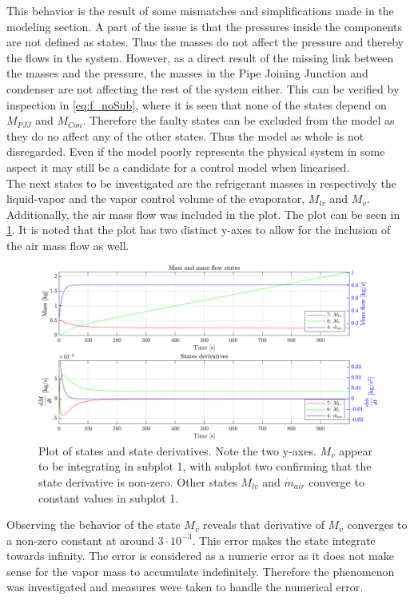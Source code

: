 This behavior is the result of some mismatches and simplifications made in the modeling section. A part of the issue is that the pressures inside the components are not defined as states. Thus the masses do not affect the pressure and thereby the flows in the system. However, as a direct result of the missing link between the masses and the pressure, the masses in the Pipe Joining Junction and condenser are not affecting the rest of the system either. This can be verified by inspection in \cref{eq:f_noSub}, where it is seen that none of the states depend on $M_{PJJ}$ and $M_{Con}$. Therefore the faulty states can be excluded from the model as they do no affect any of the other states. Thus the model as whole is not disregarded. Even if the model poorly represents the physical system in some aspect it may still be a candidate for a control model when linearised. \\

The next states to be investigated are the refrigerant masses in respectively the liquid-vapor and the vapor control volume of the evaporator, $ M_{lv} $ and $ M_v $. Additionally, the air mass flow was included in the plot. The plot can be seen in \cref{fig:non_lin_sim_Mass_Mvfucked}. It is noted that the plot has two distinct y-axes to allow for the inclusion of the air mass flow as well.
\begin{figure}[h]
	\centering
	\includegraphics[width=1\textwidth]{Graphics/nonlin_sim_Mass_Mvfucked.png}
	\caption{Plot of states and state derivatives. Note the two y-axes. $ M_v $ appear to be integrating in subplot 1, with subplot two confirming that the state derivative is non-zero. Other states $ M_{lv} $ and $ \dot{m}_{air} $ converge to constant values in subplot 1.}
	\label{fig:non_lin_sim_Mass_Mvfucked}
\end{figure}
Observing the behavior of the state $ M_v $ reveals that  derivative of $M_v$ converges to a non-zero constant at around $ 3\cdot 10^{-3} $. This error makes the state integrate towards infinity. The error is considered as a numeric error as it does not make sense for the vapor mass to accumulate indefinitely. Therefore the phenomenon was investigated and measures were taken to handle the numerical error.

